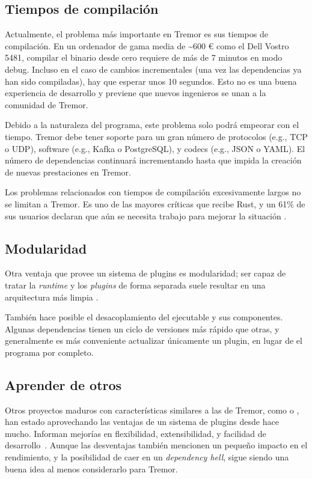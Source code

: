 \subsection{Tiempos de compilación}

Actualmente, el problema más importante en Tremor es sus tiempos de compilación.
En un ordenador de gama media de \~{}600 € como el Dell Vostro 5481, compilar el
binario  desde cero requiere de más de 7 minutos en modo debug.
Incluso en el caso de cambios incrementales (una vez las dependencias ya han
sido compiladas), hay que esperar unos 10 segundos. Esto no es una buena
experiencia de desarrollo y previene que nuevos ingenieros se unan a la
comunidad de Tremor.

Debido a la naturaleza del programa, este problema solo podrá empeorar con el
tiempo. Tremor debe tener soporte para un gran número de protocolos (e.g., TCP
o UDP), software (e.g., Kafka o PostgreSQL), y codecs (e.g., JSON o YAML). El
número de dependencias continuará incrementando hasta que impida la creación de
nuevas prestaciones en Tremor.

Los problemas relacionados con tiempos de compilación excesivamente largos no se
limitan a Tremor. Es uno de las mayores críticas que recibe Rust, y un 61\% de
sus usuarios declaran que aún se necesita trabajo para mejorar la situación
\cite{rustsurvey}.

\subsection{Modularidad}

Otra ventaja que provee un sistema de plugins es modularidad; ser capaz de
tratar la \emph{runtime} y los \emph{plugins} de forma separada suele resultar
en una arquitectura más limpia \cite{baldwin2000design}.

También hace posible el desacoplamiento del ejecutable y sus componentes.
Algunas dependencias tienen un ciclo de versiones más rápido que otras, y
generalmente es más conveniente actualizar únicamente un plugin, en lugar de el
programa por completo.

\subsection{Aprender de otros}

Otros proyectos maduros con características similares a las de Tremor, como
\textcite{nginx} o \textcite{apachehttpserver}, han estado aprovechando las
ventajas de un sistema de plugins desde hace mucho. Informan mejorías en
flexibilidad, extensibilidad, y facilidad de
desarrollo~\cite{nginxPluginsAdvantages}\cite{apachePluginsAdvantages}. Aunque
las desventajas también mencionen un pequeño impacto en el rendimiento, y la
posibilidad de caer en un \emph{dependency hell}, sigue siendo una buena idea al
menos considerarlo para Tremor.

